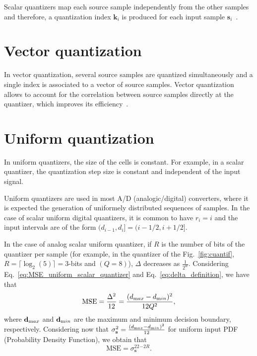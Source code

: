 Scalar quantizers map each source sample independently from the other
samples and therefore, a quantization index ${\mathbf k}_i$ is
produced for each input sample ${\mathbf
  s}_i$~\cite{vruiz__scalar_quantization}.

\section{Vector quantization}

In vector quantization, several source samples are quantized
simultaneously and a single index is associated to a vector of source
samples. Vector quantization allows to account for the correlation
between source samples directly at the quantizer, which improves its
efficiency~.

\section{Uniform quantization}

In uniform quantizers, the size of the cells is constant. For example,
in a scalar quantizer, the quantization step size is constant and
independent of the input signal.

Uniform quantizers are used in most A/D (analogic/digital) converters,
where it is expected the generation of uniformely distributed
sequences of samples. In the case of scalar uniform digital
quantizers, it is common to have $r_i=i$ and the input intervals are
of the form $(d_{i-1},d_i]=(i-1/2,i+1/2]$.

In the case of analog scalar uniform quantizer, if $R$ is the number
of bits of the quantizer per sample (for example, in the quantizer of
the Fig.~\ref{fig:cuantif}, $R=\lceil\log_2(5)\rceil=3$-bits and
$(Q=8)$), $\Delta$ decreases as $\frac{1}{2^R}$. Considering
Eq.~\ref{eq:MSE_uniform_scalar_quantizer} and
Eq.~\ref{eq:delta_definition}, we have that
\begin{equation}
  \text{MSE} = \frac{\Delta^2}{12} = \frac{(d_{\text max}-d_{\text
      min})^2}{12Q^2},
\end{equation}
where ${\mathbf d}_{\text max}$ and ${\mathbf d}_{\text min}$ are the
maximum and minimum decision boundary, respectively. Considering now
that $\sigma^2_{\mathbf s}=\frac{(d_{\text max}-d_{\text min})^2}{12}$
for uniform input PDF (Probability Density Function), we obtain that
\begin{equation}
  \text{MSE} = \sigma_{\mathbf s}^22^{-2R}.
\end{equation}

